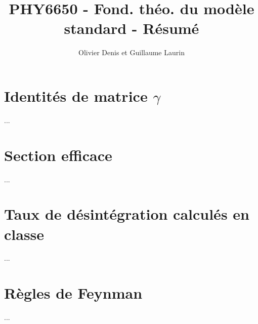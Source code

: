 \documentclass[12pt]{article}
\begin{document}
\title{PHY6650 - Fond. théo. du modèle standard - Résumé}
\author{Olivier Denis et Guillaume Laurin}
\maketitle
\newpage

\section{Identités de matrice $\gamma$}
...

\section{Section efficace}
...

\section{Taux de désintégration calculés en classe}
...

\section{Règles de Feynman}
...
\end{document}
